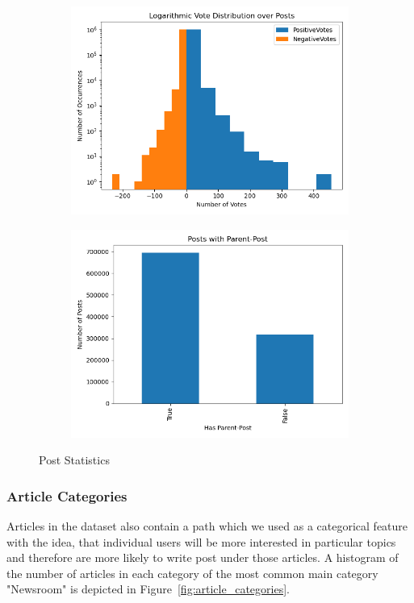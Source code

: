 \documentclass[acmsmall]{acmart}
\begin{document}
\begin{figure}[H]
\centering
\begin{subfigure}{.5\textwidth}
\centering
  \includegraphics[width=.9\linewidth]{assets/Logarithmic_Vote_Distribution_over_Posts.png}
 \end{subfigure}%
\begin{subfigure}{.5\textwidth}
\centering
  \includegraphics[width=.9\linewidth]{assets/Posts_with_parent_post.png}
 \end{subfigure}
 \caption{Post Statistics}
\label{fig:post_stats}
\end{figure}

\subsubsection{Article Categories}
Articles in the dataset also contain a path which we used as a categorical feature with the idea, that individual users will be more interested in particular topics and therefore are more likely to write post under those articles. A histogram of the number of articles in each category of the most common main category "Newsroom" is depicted in Figure~\ref{fig:article_categories}.
\end{document}
